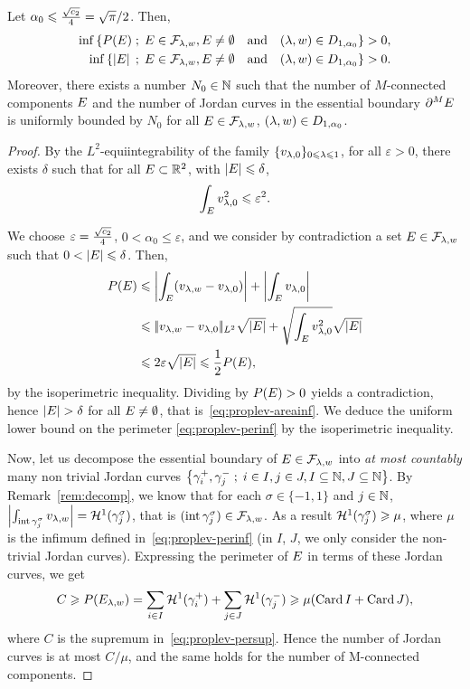 \begin{lem}\label{lem:lower_bound_lev_sets}%
  Let $\alpha_0\leqslant \frac{\sqrt{c_2}}{4}=\sqrt{\pi}/2$. Then, 
\begin{align}
  \label{eq:proplev-perinf}  \inf \left\{ P(E) \;;\; E\in \mathcal{F}_{\lambda,w}, E\neq \emptyset \quad \text{and} \quad (\lambda,w)\in D_{1,\alpha_0}  \right\}&>0,\\
  \label{eq:proplev-areainf} \inf \left\{ \left| E \right| \;;\; E\in \mathcal{F}_{\lambda,w}, E\neq \emptyset  \quad \text{and} \quad (\lambda,w)\in D_{1,\alpha_0}  \right\}&>0.
\end{align}
Moreover, there exists a number $N_0\in\mathbb{N}$ such that the number of $M$-connected components $E$ and the number of Jordan curves in the essential boundary $\partial^ME$ is uniformly bounded by $N_0$ for all $E\in \mathcal{F}_{\lambda,w}$, $(\lambda,w)\in D_{1,\alpha_0}$.
\end{lem}
\begin{proof}
  By the $L^2$-equiintegrability of the family $\{v_{\lambda,0}\}_{0\leqslant \lambda \leqslant 1}$, for all $\varepsilon>0$, there exists $\delta$ such that for all $E\subset \mathbb{R}^2$, with $\left| E \right|\leqslant \delta$,
\begin{equation*}
  \int_{E} v_{\lambda,0}^2 \leqslant \varepsilon^2.
\end{equation*}

We choose $\varepsilon = \frac{\sqrt{c_2}}{4}$, $0<\alpha_0\leq \varepsilon$, and we consider by contradiction a set $E\in \mathcal{F}_{\lambda,w}$ such that $0<\left| E \right|\leqslant \delta$.
Then,
\begin{align*}
  P(E)  &\leqslant \left| \int_{E}(v_{\lambda,w}-v_{\lambda,0}) \right| + \left| \int_{E}v_{\lambda,0} \right|\\
             &\leqslant |\!| v_{\lambda,w}-v_{\lambda,0} |\!|_{L^2}\sqrt{\left| E \right|} + \sqrt{\int_{E} v_{\lambda,0}^2}\sqrt{\left| E \right|}\\
             &\leqslant 2\varepsilon \sqrt{\left| E \right|}\leqslant \frac{1}{2} P(E),
\end{align*}
by the isoperimetric inequality. Dividing by $P(E)>0$ yields a contradiction, hence $\abs{\Elaws}> \delta$ for all $E\neq \emptyset$, that is~\eqref{eq:proplev-areainf}.
We deduce the uniform lower bound on the perimeter \eqref{eq:proplev-perinf} by the isoperimetric inequality.

Now, let us decompose the essential boundary of $E\in \mathcal{F}_{\lambda,w}$ into \emph{at most countably} many non trivial Jordan curves $\left\{ \gamma^+_i,\gamma^-_j \;;\; i\in I,j\in J, I\subseteq\mathbb{N},J\subseteq \mathbb{N} \right\}$.
By Remark~\ref{rem:decomp}, we know that for each $\sigma\in\{-1,1\}$ and $j\in\mathbb{N}$, $\left| \int_{\operatorname{int}{\gamma^\sigma_j}}v_{\lambda,w} \right| = \mathcal{H}^1(\gamma^\sigma_j)$, that is $(\operatorname{int} \gamma^\sigma_j)\in\mathcal{F}_{\lambda,w}$. As a result $\mathcal{H}^1(\gamma^\sigma_j)\geqslant \mu$, where $\mu$ is the infimum defined in~\eqref{eq:proplev-perinf} (in $I$, $J$, we only consider the non-trivial Jordan curves).
Expressing the perimeter of $E$ in terms of these Jordan curves, we get
$$
C\geqslant P(E_{\lambda,w}) = \sum_{i\in I}\mathcal{H}^1(\gamma^+_i)+ \sum_{j\in J}\mathcal{H}^1(\gamma^-_j)\geqslant \mu(\operatorname{Card}{I}+\operatorname{Card}{J}),
$$
where $C$ is the supremum in~\eqref{eq:proplev-persup}. Hence the number of Jordan curves is at most $C/\mu$, and the same holds for the number of M-connected components.
\end{proof}  

